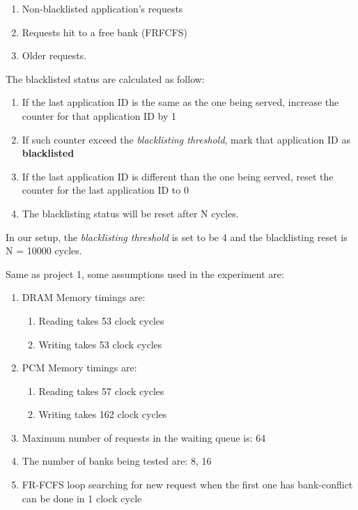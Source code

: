 \documentclass[letterpaper, 11pt]{article}
\begin{document}
\begin{enumerate}
	\item Non-blacklisted application’s requests
	\item Requests hit to a free bank (FRFCFS)
	\item Older requests.
\end{enumerate}

The blacklisted status are calculated as follow:

\begin{enumerate}
	\item If the last application ID is the same as the one being served, increase the counter for that application ID by 1
	\item If such counter exceed the \textit{blacklisting threshold}, mark that application ID as \textbf{blacklisted}
	\item If the last application ID is different than the one being served, reset the counter for the last application ID to 0
	\item The blacklisting status will be reset after N cycles.
\end{enumerate}

In our setup, the \textit{blacklisting threshold} is set to be 4 and the blacklisting reset is N = 10000 cycles.

Same as project 1, some assumptions used in the experiment are:
\begin{enumerate}
	\item DRAM Memory timings are:
	\begin{enumerate}
		\item Reading takes 53 clock cycles
		\item Writing takes 53 clock cycles
	\end{enumerate}
	\item PCM Memory timings are:
	\begin{enumerate}
		\item Reading takes 57 clock cycles
		\item Writing takes 162 clock cycles
	\end{enumerate}
	\item Maximum number of requests in the waiting queue is: 64
	\item The number of banks being tested are: 8, 16
	\item FR-FCFS loop searching for new request when the first one has bank-conflict can be done in 1 clock cycle
\end{enumerate}
\end{document}
